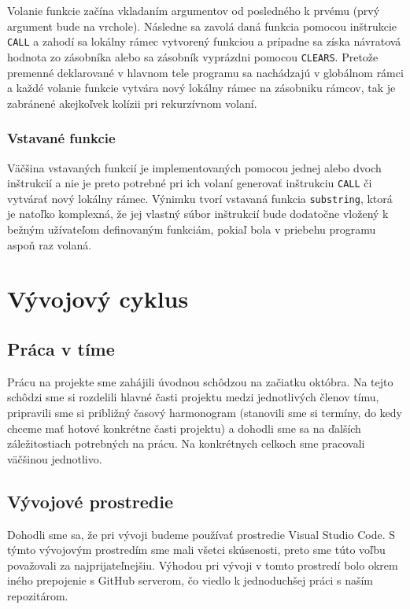 \documentclass[a4paper,11pt]{article}
\begin{document}
Volanie funkcie začína vkladaním argumentov od posledného k prvému (prvý argument bude na vrchole). Následne sa zavolá daná funkcia pomocou inštrukcie \texttt{CALL} a zahodí sa lokálny rámec vytvorený funkciou a prípadne sa získa návratová hodnota zo zásobníka alebo sa zásobník vyprázdni pomocou \texttt{CLEARS}.
Pretože premenné deklarované v hlavnom tele programu sa nachádzajú v globálnom rámci a každé volanie funkcie vytvára nový lokálny rámec na zásobniku rámcov, tak je zabránené akejkoľvek kolízii pri rekurzívnom volaní. 

 \subsubsection{Vstavané funkcie}
 Väčšina vstavaných funkcií je implementovaných pomocou jednej alebo dvoch inštrukcií a nie je preto potrebné pri ich volaní generovať inštrukciu \texttt{CALL} či vytvárať nový lokálny rámec. Výnimku tvorí vstavaná funkcia \texttt{substring}, ktorá je natoľko komplexná, že jej vlastný súbor inštrukcií bude dodatočne vložený k bežným užívateľom definovaným funkciám, pokiaľ bola v priebehu programu aspoň raz volaná.






\section{Vývojový cyklus}
\subsection{Práca v tíme}
Prácu na projekte sme zahájili úvodnou schôdzou na začiatku októbra. Na tejto schôdzi sme si rozdelili hlavné časti projektu medzi jednotlivých členov tímu, pripravili sme si približný časový harmonogram (stanovili sme si termíny, do kedy chceme mať hotové konkrétne časti projektu) a dohodli sme sa na ďalších záležitostiach potrebných na prácu. Na konkrétnych celkoch sme pracovali väčšinou jednotlivo.

\subsection{Vývojové prostredie}
Dohodli sme sa, že pri vývoji budeme používať prostredie Visual Studio Code. S týmto vývojovým prostredím sme mali všetci skúsenosti, preto sme túto voľbu považovali za najprijateľnejšiu. Výhodou pri vývoji v tomto prostredí bolo okrem iného prepojenie s GitHub serverom, čo viedlo k jednoduchšej práci s naším repozitárom.
\end{document}
